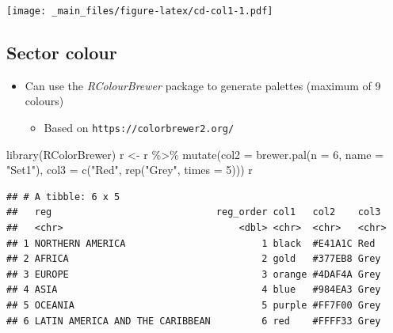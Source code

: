 \documentclass[
]{book}
\newenvironment{Shaded}{\begin{snugshade}}{\end{snugshade}}
\newcommand{\AttributeTok}[1]{\textcolor[rgb]{0.77,0.63,0.00}{#1}}
\newcommand{\DecValTok}[1]{\textcolor[rgb]{0.00,0.00,0.81}{#1}}
\newcommand{\FunctionTok}[1]{\textcolor[rgb]{0.00,0.00,0.00}{#1}}
\newcommand{\NormalTok}[1]{#1}
\newcommand{\OtherTok}[1]{\textcolor[rgb]{0.56,0.35,0.01}{#1}}
\newcommand{\SpecialCharTok}[1]{\textcolor[rgb]{0.00,0.00,0.00}{#1}}
\newcommand{\StringTok}[1]{\textcolor[rgb]{0.31,0.60,0.02}{#1}}
\providecommand{\tightlist}{%
  \setlength{\itemsep}{0pt}\setlength{\parskip}{0pt}}
\begin{document}
\begin{Shaded}
\end{Shaded}

\texttt{[image: \_main\_files/figure-latex/cd-col1-1.pdf]}

\hypertarget{sector-colour}{%
\subsection{Sector colour}\label{sector-colour}}

\begin{itemize}
\tightlist
\item
  Can use the \emph{RColourBrewer} package to generate palettes (maximum of 9 colours)

  \begin{itemize}
  \tightlist
  \item
    Based on \texttt{https://colorbrewer2.org/}
  \end{itemize}
\end{itemize}

\begin{Shaded}
\begin{Highlighting}[]
\FunctionTok{library}\NormalTok{(RColorBrewer)}
\NormalTok{r }\OtherTok{\textless{}{-}}\NormalTok{ r }\SpecialCharTok{\%\textgreater{}\%}
  \FunctionTok{mutate}\NormalTok{(}\AttributeTok{col2 =} \FunctionTok{brewer.pal}\NormalTok{(}\AttributeTok{n =} \DecValTok{6}\NormalTok{, }\AttributeTok{name =} \StringTok{"Set1"}\NormalTok{),}
         \AttributeTok{col3 =} \FunctionTok{c}\NormalTok{(}\StringTok{"Red"}\NormalTok{, }\FunctionTok{rep}\NormalTok{(}\StringTok{"Grey"}\NormalTok{, }\AttributeTok{times =} \DecValTok{5}\NormalTok{)))}
\NormalTok{r}
\end{Highlighting}
\end{Shaded}

\begin{verbatim}
## # A tibble: 6 x 5
##   reg                             reg_order col1   col2    col3 
##   <chr>                               <dbl> <chr>  <chr>   <chr>
## 1 NORTHERN AMERICA                        1 black  #E41A1C Red  
## 2 AFRICA                                  2 gold   #377EB8 Grey 
## 3 EUROPE                                  3 orange #4DAF4A Grey 
## 4 ASIA                                    4 blue   #984EA3 Grey 
## 5 OCEANIA                                 5 purple #FF7F00 Grey 
## 6 LATIN AMERICA AND THE CARIBBEAN         6 red    #FFFF33 Grey
\end{verbatim}
\end{document}
